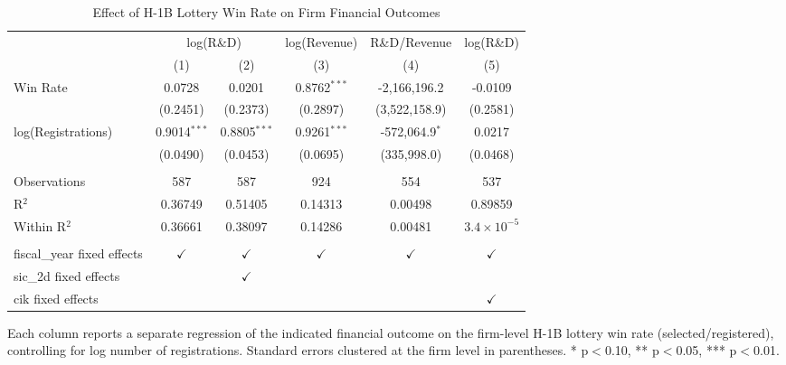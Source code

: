 \begin{table}[htbp]
   \caption{\label{tab:main} Effect of H-1B Lottery Win Rate on Firm Financial Outcomes}
   \bigskip
   \centering
   \begin{adjustbox}{max width=\textwidth}
   \begin{tabular}{lccccc}
      \toprule
       & \multicolumn{2}{c}{log(R\&D)} & log(Revenue) & R\&D/Revenue & log(R\&D)\\
                                  & (1)            & (2)            & (3)            & (4)              & (5)\\  
      \midrule 
      Win Rate                    & 0.0728         & 0.0201         & 0.8762$^{***}$ & -2,166,196.2     & -0.0109\\   
                                  & (0.2451)       & (0.2373)       & (0.2897)       & (3,522,158.9)    & (0.2581)\\   
      log(Registrations)          & 0.9014$^{***}$ & 0.8805$^{***}$ & 0.9261$^{***}$ & -572,064.9$^{*}$ & 0.0217\\   
                                  & (0.0490)       & (0.0453)       & (0.0695)       & (335,998.0)      & (0.0468)\\   
       \\
      Observations                & 587            & 587            & 924            & 554              & 537\\  
      R$^2$                       & 0.36749        & 0.51405        & 0.14313        & 0.00498          & 0.89859\\  
      Within R$^2$                & 0.36661        & 0.38097        & 0.14286        & 0.00481          & $3.4\times 10^{-5}$\\   
       \\
      fiscal\_year fixed effects  & $\checkmark$   & $\checkmark$   & $\checkmark$   & $\checkmark$     & $\checkmark$\\   
      sic\_2d fixed effects       &                & $\checkmark$   &                &                  & \\  
      cik fixed effects           &                &                &                &                  & $\checkmark$\\   
      \bottomrule
   \end{tabular}
   \end{adjustbox}

   \par \raggedright 
   Each column reports a separate regression of the indicated financial outcome on the firm-level H-1B lottery win rate (selected/registered), controlling for log number of registrations. Standard errors clustered at the firm level in parentheses. * p$<$0.10, ** p$<$0.05, *** p$<$0.01.
\end{table}
